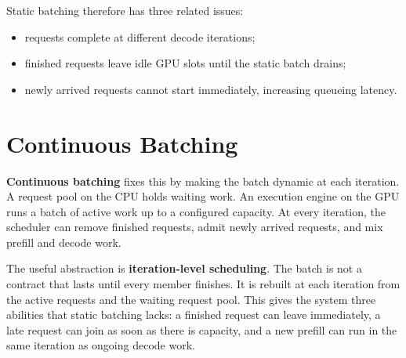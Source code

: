 \documentclass[11pt]{article}
\begin{document}
Static batching therefore has three related issues:
\begin{itemize}
  \item requests complete at different decode iterations;
  \item finished requests leave idle GPU slots until the static batch drains;
  \item newly arrived requests cannot start immediately, increasing queueing latency.
\end{itemize}

\section{Continuous Batching}

\textbf{Continuous batching} fixes this by making the batch dynamic at each iteration.  A request pool on the CPU holds waiting work.  An execution engine on the GPU runs a batch of active work up to a configured capacity.  At every iteration, the scheduler can remove finished requests, admit newly arrived requests, and mix prefill and decode work.

The useful abstraction is \textbf{iteration-level scheduling}.  The batch is not a contract that lasts until every member finishes.  It is rebuilt at each iteration from the active requests and the waiting request pool.  This gives the system three abilities that static batching lacks: a finished request can leave immediately, a late request can join as soon as there is capacity, and a new prefill can run in the same iteration as ongoing decode work.
\end{document}
